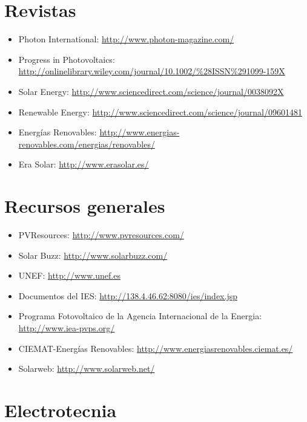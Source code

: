 \section{Revistas}
\label{sec:revistas}

\begin{itemize}
\item Photon International: \url{http://www.photon-magazine.com/}
\item Progress in Photovoltaics:
  \url{http://onlinelibrary.wiley.com/journal/10.1002/\%28ISSN\%291099-159X}
\item Solar Energy:
  \url{http://www.sciencedirect.com/science/journal/0038092X}
\item Renewable Energy:
  \url{http://www.sciencedirect.com/science/journal/09601481}
\item Energías Renovables: \url{http://www.energias-renovables.com/energias/renovables/}
\item Era Solar: \url{http://www.erasolar.es/}
\end{itemize}

\section{Recursos generales}
\label{sec:general}

\begin{itemize}
\item PVResources: \url{http://www.pvresources.com/}
\item Solar Buzz: \url{http://www.solarbuzz.com/}
\item UNEF: \url{http://www.unef.es}
\item Documentos del IES: \url{http://138.4.46.62:8080/ies/index.jsp}
\item Programa Fotovoltaico de la Agencia Internacional de la Energia:
  \url{http://www.iea-pvps.org/}
\item CIEMAT-Energías Renovables: \url{http://www.energiasrenovables.ciemat.es/}
\item Solarweb: \url{http://www.solarweb.net/}
\end{itemize}


\section{Electrotecnia}
\label{sec:electrotecnia}


